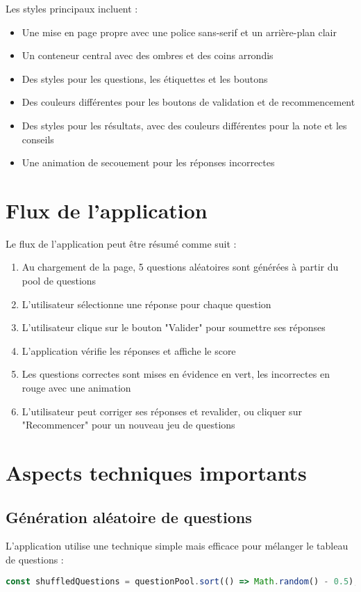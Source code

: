 \documentclass{article}
\begin{document}
Les styles principaux incluent :
\begin{itemize}
    \item Une mise en page propre avec une police sans-serif et un arrière-plan clair
    \item Un conteneur central avec des ombres et des coins arrondis
    \item Des styles pour les questions, les étiquettes et les boutons
    \item Des couleurs différentes pour les boutons de validation et de recommencement
    \item Des styles pour les résultats, avec des couleurs différentes pour la note et les conseils
    \item Une animation de secouement pour les réponses incorrectes
\end{itemize}

\section{Flux de l'application}
Le flux de l'application peut être résumé comme suit :

\begin{enumerate}
    \item Au chargement de la page, 5 questions aléatoires sont générées à partir du pool de questions
    \item L'utilisateur sélectionne une réponse pour chaque question
    \item L'utilisateur clique sur le bouton "Valider" pour soumettre ses réponses
    \item L'application vérifie les réponses et affiche le score
    \item Les questions correctes sont mises en évidence en vert, les incorrectes en rouge avec une animation
    \item L'utilisateur peut corriger ses réponses et revalider, ou cliquer sur "Recommencer" pour un nouveau jeu de questions
\end{enumerate}

\section{Aspects techniques importants}

\subsection{Génération aléatoire de questions}
L'application utilise une technique simple mais efficace pour mélanger le tableau de questions :
\begin{lstlisting}[language=JavaScript]
const shuffledQuestions = questionPool.sort(() => Math.random() - 0.5);
\end{lstlisting}
\end{document}
